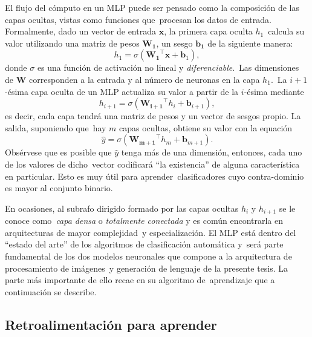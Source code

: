 El flujo del cómputo en un MLP puede ser pensado como la composición de las capas ocultas, vistas como funciones que\
procesan los datos de entrada. Formalmente, dado un vector de entrada $\mathbf{x}$, la primera capa oculta $h_1$\
calcula su valor utilizando una matriz de pesos $\mathbf{W_1}$, un sesgo $\mathbf{b_1}$ de la siguiente manera:
\begin{equation}
  h_1 = \sigma\left(\mathbf{W_1}^\top \mathbf{x} + \mathbf{b}_1\right),
\end{equation}
donde $\sigma$ es una función de activación no lineal y \emph{diferenciable}.\
Las dimensiones de $\mathbf{W}$ corresponden a la entrada y al número de neuronas en la capa $h_1$.\
La $i+1$-ésima capa oculta de un MLP actualiza su valor a partir de la $i$-ésima mediante
\begin{equation}
  h_{i+1} = \sigma\left(\mathbf{W_{i+1}}^\top h_i + \mathbf{b}_{i+1}\right),
\end{equation}
es decir, cada capa tendrá una matriz de pesos y un vector de sesgos propio. La salida, suponiendo que\
hay $m$ capas ocultas, obtiene su valor con la equación
\begin{equation}
  \hat{y} = \sigma\left(\mathbf{W_{m+1}}^\top h_m + \mathbf{b}_{m+1}\right).
\end{equation}
Obsérvese que es posible que $\hat{y}$ tenga más de una dimensión, entonces, cada uno de los valores de dicho\
vector codificará ``la existencia'' de alguna característica en particular. Esto es muy útil para aprender\
clasificadores cuyo contra-dominio es mayor al conjunto binario.\par
En ocasiones, al subrafo dirigido formado por las capas ocultas $h_i$ y $h_{i+1}$ se le conoce como\
\emph{capa densa} o \emph{totalmente conectada} y es común encontrarla en arquitecturas de mayor complejidad\
y especialización. El MLP está dentro del ``estado del arte'' de los algoritmos de clasificación automática y\
será parte fundamental de los dos modelos neuronales que compone a la arquitectura de procesamiento de imágenes\
y generación de lenguaje de la presente tesis. La parte más importante de ello recae en su algoritmo de\
aprendizaje que a continuación se describe.

\subsection{Retroalimentación para aprender}
